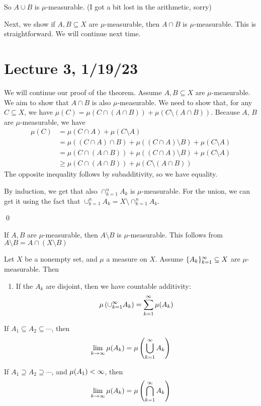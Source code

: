 \documentclass[x11names,reqno,14pt]{extarticle}
\newcommand{\seq}[1]{_{#1 = 1}^\oo}
\begin{document}
So $A \cup B$ is $\mu$-measurable. (I got a bit lost in the arithmetic, sorry)

Next, we show if $A, B\subseteq X$ are $\mu$-measurable, then $A \cap B$ is $\mu$-measurable. This is straightforward. We will continue next time. 

\section*{Lecture 3, 1/19/23}

We will continue our proof of the theorem. Assume $A, B \subseteq X$ are $\mu$-measurable. We aim to show that $A \cap B$ is also $\mu$-measurable. We need to show that, for any $C \subseteq X$, we have $\mu(C) = \mu(C\cap(A\cap B)) + \mu(C\setminus(A\cap B))$. Because $A$, $B$ are $\mu$-measurable, we have
\begin{align*}
\mu(C) &  = \mu(C \cap A) + \mu(C\setminus A) \\
		 & = \mu((C\cap A) \cap B) + \mu((C\cap A) \setminus B) + \mu(C\setminus A) \\
		 & = \mu(C\cap (A \cap B)) + \mu((C\cap A) \setminus B) + \mu(C\setminus A) \\
		 & \geq \mu(C\cap (A \cap B)) + \mu(C\setminus(A \cap B))
\end{align*}
The opposite inequality follows by subadditivity, so we have equality. 

By induction, we get that also $\cap_{k=1}^n A_k$ is $\mu$-measurable. For the union, we can get it using the fact that $\cup_{k=1}^nA_k = X \setminus \cap_{k=1}^nA_k$.

\qed

\rem If $A, B$ are $\mu$-measurable, then $A \setminus B$ is $\mu$-measurable. This follows from $A \setminus B = A \cap (X \setminus B)$

\thm 

Let $X$ be a nonempty set, and $\mu$ a measure on $X$. Assume $\{A_k\}\seq{k}\subseteq X$ are $\mu$-measurable. Then
\begin{enumerate}
\item If the $A_k$ are disjoint, then we have countable additivity:
\[
\mu\left(\cup\seq{k}A_k\right) = \sum\seq{k}\mu(A_k)
\]
\end{enumerate}
\item If $A_1 \subseteq A_2 \subseteq \cdots$, then 
\[
\lim_{k\to\oo}\mu(A_k) = \mu\left(\bigcup\seq{k}A_k\right)
\]
\item If $A_1 \supseteq A_2 \supseteq \cdots$, and $\mu(A_1) < \infty$, then 
\[
\lim_{k\to\oo}\mu(A_k) = \mu\left(\bigcap\seq{k}A_k\right)
\]
\end{document}
